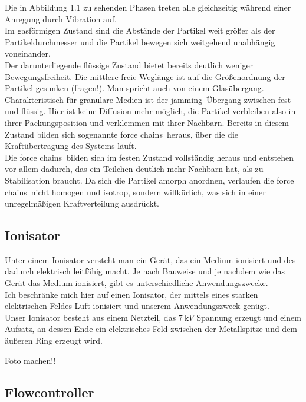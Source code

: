 Die in Abbildung 1.1 zu sehenden Phasen treten alle gleichzeitig während einer Anregung durch Vibration auf. \\
Im gasförmigen Zustand sind die Abstände der Partikel weit größer als der Partikeldurchmesser und die Partikel bewegen sich weitgehend unabhängig voneinander. \\
Der darunterliegende flüssige Zustand bietet bereits deutlich weniger Bewegungsfreiheit. Die mittlere freie Weglänge ist auf die Größenordnung der Partikel gesunken (fragen!). Man spricht auch von einem Glasübergang. \\
Charakteristisch für granulare Medien ist der \glqq jamming\grqq \ Übergang zwischen fest und flüssig. Hier ist keine Diffusion mehr möglich, die Partikel verbleiben also in ihrer Packungsposition und verklemmen mit ihrer Nachbarn. Bereits in diesem Zustand bilden sich sogenannte \glqq force chains\grqq \ heraus, über die die Kraftübertragung des Systems läuft. \\
Die \glqq force chains\grqq \ bilden sich im festen Zustand vollständig heraus und entstehen vor allem dadurch, das ein Teilchen deutlich mehr Nachbarn hat, als zu Stabilisation braucht. Da sich die Partikel amorph anordnen, verlaufen die \glqq force chains\grqq \ nicht homogen und isotrop, sondern willkürlich, was sich in einer unregelmäßigen Kraftverteilung ausdrückt.



\subsection{Ionisator}

Unter einem Ionisator versteht man ein Gerät, das ein Medium ionisiert und des dadurch elektrisch leitfähig macht. Je nach Bauweise und je nachdem wie das Gerät das Medium ionisiert, gibt es unterschiedliche Anwendungszwecke. \\
Ich beschränke mich hier auf einen Ionisator, der mittels eines starken elektrischen Feldes Luft ionisiert und unserem Anwendungszweck genügt. \\
Unser Ionisator besteht aus einem Netzteil, das $\SI{7}{\kilo V}$ Spannung erzeugt und einem Aufsatz, an dessen Ende ein elektrisches Feld zwischen der Metallspitze und dem äußeren Ring erzeugt wird.


Foto machen!!


\subsection{Flowcontroller}

